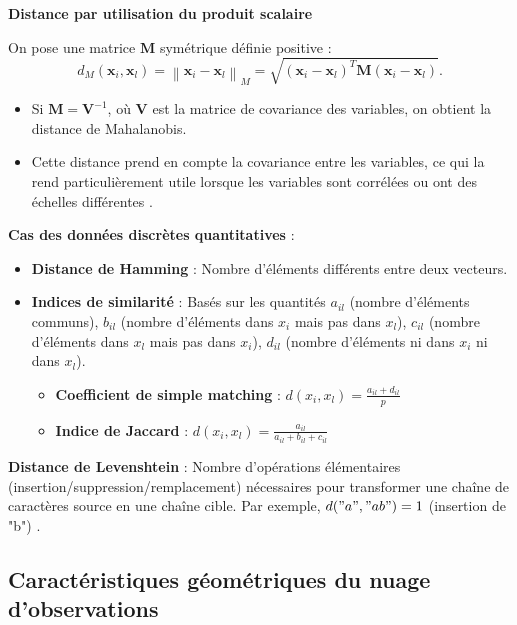\documentclass[10pt,a4paper]{article}
\begin{document}
\textbf{Distance par utilisation du produit scalaire} 

On pose une matrice $\mathbf{M}$ symétrique définie positive :
$$d_M(\mathbf{x}_i, \mathbf{x}_l) = \left\| \mathbf{x}_i - \mathbf{x}_l \right\|_{M} = \sqrt{(\mathbf{x}_i - \mathbf{x}_l)^T \mathbf{M}(\mathbf{x}_i - \mathbf{x}_l)}.$$
\begin{itemize}
    \item Si $\mathbf{M} = \mathbf{V}^{-1}$, où $\mathbf{V}$ est la matrice de covariance des variables, on obtient la distance de Mahalanobis.
    \item Cette distance prend en compte la covariance entre les variables, ce qui la rend particulièrement utile lorsque les variables sont corrélées ou ont des échelles différentes \cite{mahalanobis-wikipedia, mahalanobis-machinelearningplus}.
\end{itemize}

\textbf{Cas des données discrètes quantitatives} :
\begin{itemize}
    \item \textbf{Distance de Hamming} : Nombre d'éléments différents entre deux vecteurs.
    \item \textbf{Indices de similarité} : Basés sur les quantités $a_{il}$ (nombre d'éléments communs), $b_{il}$ (nombre d'éléments dans $x_i$ mais pas dans $x_l$), $c_{il}$ (nombre d'éléments dans $x_l$ mais pas dans $x_i$), $d_{il}$ (nombre d'éléments ni dans $x_i$ ni dans $x_l$).
    \begin{itemize}
        \item \textbf{Coefficient de simple matching} : $d(x_i, x_l) = \frac{a_{il} + d_{il}}{p}$
        \item \textbf{Indice de Jaccard} : $d(x_i, x_l) = \frac{a_{il}}{a_{il} + b_{il} + c_{il}}$
    \end{itemize}
\end{itemize}

\textbf{Distance de Levenshtein} :
Nombre d'opérations élémentaires (insertion/suppression/remplacement) nécessaires pour transformer une chaîne de caractères source en une chaîne cible. Par exemple, $d("a", "ab") = 1$ (insertion de "b") \cite{levenshtein-wikipedia}.

\subsection*{Caractéristiques géométriques du nuage d'observations}
\end{document}
